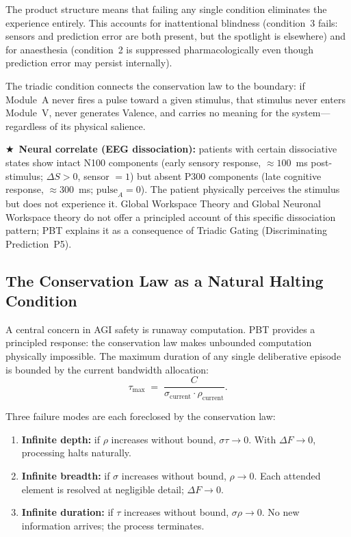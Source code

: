 \documentclass[12pt,a4paper]{article}
\newcommand{\starred}{\textbf{\textcolor{pbtblue}{$\bigstar$}}~}
\begin{document}
The product structure means that failing any single condition eliminates the
experience entirely. This accounts for inattentional blindness (condition~3
fails: sensors and prediction error are both present, but the spotlight is
elsewhere) and for anaesthesia (condition~2 is suppressed
pharmacologically even though prediction error may persist internally).

The triadic condition connects the conservation law to the boundary: if
Module~A never fires a pulse toward a given stimulus, that stimulus never
enters Module~V, never generates Valence, and carries no meaning for the
system---regardless of its physical salience.

\starred\textbf{Neural correlate (EEG dissociation):} patients with certain
dissociative states show intact N100 components (early sensory response,
$\approx 100$~ms post-stimulus; $\Delta S > 0$, sensor $= 1$) but absent
P300 components (late cognitive response, $\approx 300$~ms;
$\mathrm{pulse}_A = 0$). The patient physically perceives the stimulus but does
not experience it. Global Workspace Theory and Global Neuronal Workspace theory
do not offer a principled account of this specific dissociation pattern; PBT
explains it as a consequence of Triadic Gating (Discriminating Prediction~P5).

\subsection{The Conservation Law as a Natural Halting Condition}

A central concern in AGI safety is runaway computation. PBT provides a
principled response: the conservation law makes unbounded computation physically
impossible. The maximum duration of any single deliberative episode is bounded by
the current bandwidth allocation:
\begin{equation}
  \tau_{\max} \;=\; \frac{C}{\sigma_{\mathrm{current}}\cdot\rho_{\mathrm{current}}}.
  \label{eq:halting}
\end{equation}

Three failure modes are each foreclosed by the conservation law:

\begin{enumerate}[leftmargin=1.8em]
  \item \textbf{Infinite depth:} if $\rho$ increases without bound, $\sigma\tau
    \to 0$. With $\Delta F\to 0$, processing halts naturally.
  \item \textbf{Infinite breadth:} if $\sigma$ increases without bound, $\rho\to
    0$. Each attended element is resolved at negligible detail; $\Delta F\to 0$.
  \item \textbf{Infinite duration:} if $\tau$ increases without bound, $\sigma\rho
    \to 0$. No new information arrives; the process terminates.
\end{enumerate}
\end{document}
